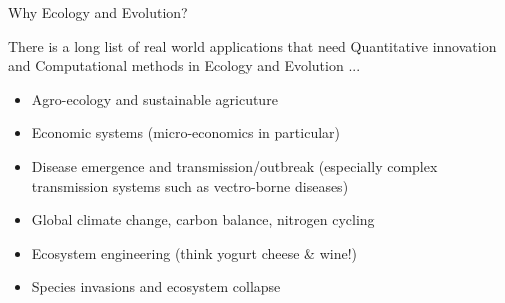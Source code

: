 \documentclass[xcolor={usenames,x11names},compress]{beamer}
\renewcommand{\(}{\begin{columns}}
\renewcommand{\)}{\end{columns}}
\newcommand{\<}[1]{\begin{column}{#1}}
\renewcommand{\>}{\end{column}}
\begin{document}
\begin{frame}{Why Ecology and Evolution?}

There is a long list of real world applications that need Quantitative innovation and Computational methods in Ecology and Evolution ...
 
  \begin{itemize}[<+->] \setlength{\itemindent}{0em}\itemsep6pt

		\item Agro-ecology and sustainable agricuture 
		
		\item Economic systems (micro-economics in particular) 

		\item Disease emergence and transmission/outbreak (especially complex transmission systems such as vectro-borne diseases)
		 
	 \item Global climate change, carbon balance, nitrogen cycling
	 
	 \item Ecosystem engineering (think yogurt cheese \& wine!)
		 
	 \item Species invasions and ecosystem collapse

  \end{itemize} 


\end{frame}

\end{document}
